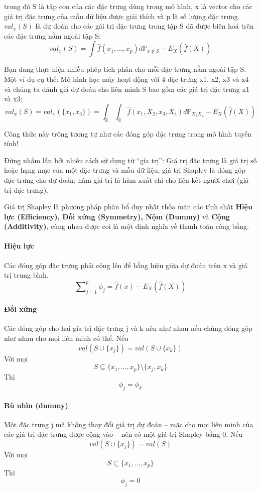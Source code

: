 trong đó S là tập con của các đặc trưng dùng trong mô hình, x là vector cho các giá trị đặc trưng của mẫu dữ liệu được giải thích và p là số lượng đặc trưng. $val_x(S)$ là dự đoán cho các gái trị đặc trưng trong tập S đã được biên hoá trên các đặc trưng nằm ngoài tập S:   
$$ val_{x}(S)=\int\hat{f}(x_{1},\ldots,x_{p})d\mathbb{P}_{x\notin{}S}-E_X(\hat{f}(X))$$

Bạn đang thực hiện nhiều phép tích phân cho mỗi đặc trưng nằm ngoài tập S. Một ví dụ cụ thể: Mô hình học máy hoạt động với 4 đặc trưng x1, x2, x3 và x4 và chúng ta đánh giá dự đoán cho liên minh S bao gồm các giá trị đặc trưng x1 và x3:
$$ val_{x}(S)=val_{x}(\{x_{1},x_{3}\})=\int_{\mathbb{R}}\int_{\mathbb{R}}\hat{f}(x_{1},X_{2},x_{3},X_{4})d\mathbb{P}_{X_2X_4}-E_X(\hat{f}(X))$$

Công thức này trông tương tự như các đóng góp đặc trưng trong mô hình tuyến tính!

Đừng nhầm lẫn bởi nhiều cách sử dụng từ ``gía trị'': Giá trị đặc trưng là giá trị số hoặc hạng mục của một đặc trưng và mẫu dữ liệu; giá trị Shapley là đóng góp đặc trưng cho dự đoán; hàm giá trị là hàm xuất chi cho liên kết người chơi (giá trị đặc trưng).

Giá trị Shapley là phương pháp phân bổ duy nhất thỏa mãn các tính chất \textbf{Hiệu lực (Efficiency), Đối xứng (Symmetry), Nộm (Dummy)} và \textbf{Cộng (Additivity)}, cùng nhau được coi là một định nghĩa về thanh toán công bằng.

\paragraph{Hiệu lực}

Các đóng góp đặc trưng phải cộng lên để bằng hiệu giữa dự đoán trên x và giá trị trung bình.
$$ \sum\nolimits_{j=1}^p\phi_j=\hat{f}(x)-E_X(\hat{f}(X))$$
\paragraph{Đối xứng}

Các đóng góp cho hai gía trị đặc trưng j và k nên như nhau nếu chúng đóng góp như nhau cho mọi liên minh có thể. Nếu
$$ val(S\cup\{x_j\})=val(S\cup\{x_k\})$$
Với mọi $$ S\subseteq\{x_{1},\ldots,x_{p}\}\setminus\{x_j,x_k\}$$
Thì $$ \phi_j=\phi_{k}$$
\paragraph{Bù nhìn (dummy)}

Một đặc trưng j mà không thay đổi giá trị dự đoán – mặc cho mọi liên minh của các giá trị đặc trưng được cộng vào – nên có một giá trị Shapley bằng 0. Nếu
$$ val(S\cup\{x_j\})=val(S)$$
Với mọi 
$$ S\subseteq\{x_{1},\ldots,x_{p}\}$$
Thì  $$\phi_j = 0$$
